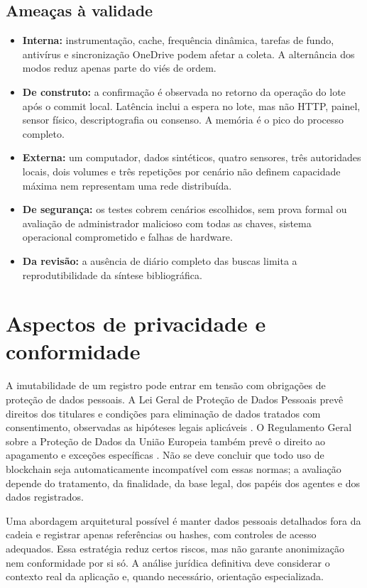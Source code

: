\documentclass[10pt,a4paper,twocolumn]{article}
\begin{document}
\subsection{Ameaças à validade}
\begin{itemize}
  \item \textbf{Interna:} instrumentação, cache, frequência dinâmica, tarefas de fundo, antivírus e sincronização OneDrive podem afetar a coleta. A alternância dos modos reduz apenas parte do viés de ordem.
  \item \textbf{De construto:} a confirmação é observada no retorno da operação do lote após o commit local. Latência inclui a espera no lote, mas não HTTP, painel, sensor físico, descriptografia ou consenso. A memória é o pico do processo completo.
  \item \textbf{Externa:} um computador, dados sintéticos, quatro sensores, três autoridades locais, dois volumes e três repetições por cenário não definem capacidade máxima nem representam uma rede distribuída.
  \item \textbf{De segurança:} os testes cobrem cenários escolhidos, sem prova formal ou avaliação de administrador malicioso com todas as chaves, sistema operacional comprometido e falhas de hardware.
  \item \textbf{Da revisão:} a ausência de diário completo das buscas limita a reprodutibilidade da síntese bibliográfica.
\end{itemize}

\section{Aspectos de privacidade e conformidade}
A imutabilidade de um registro pode entrar em tensão com obrigações de proteção de dados pessoais. A Lei Geral de Proteção de Dados Pessoais prevê direitos dos titulares e condições para eliminação de dados tratados com consentimento, observadas as hipóteses legais aplicáveis \cite{LGPD2018}. O Regulamento Geral sobre a Proteção de Dados da União Europeia também prevê o direito ao apagamento e exceções específicas \cite{GDPR2016}. Não se deve concluir que todo uso de blockchain seja automaticamente incompatível com essas normas; a avaliação depende do tratamento, da finalidade, da base legal, dos papéis dos agentes e dos dados registrados.

Uma abordagem arquitetural possível é manter dados pessoais detalhados fora da cadeia e registrar apenas referências ou hashes, com controles de acesso adequados. Essa estratégia reduz certos riscos, mas não garante anonimização nem conformidade por si só. A análise jurídica definitiva deve considerar o contexto real da aplicação e, quando necessário, orientação especializada.
\end{document}
